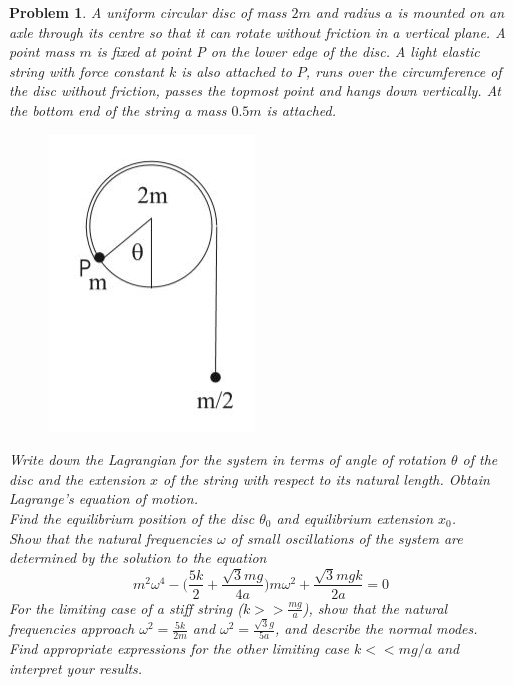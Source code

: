 \documentclass[a4paper]{article}
\theoremstyle{new}
\newtheorem{qns}{Problem}[section]
\begin{document}
\begin{qns}
A uniform circular disc of mass $2m$ and radius $a$ is mounted on an axle through its centre so that it can rotate without friction in a vertical plane. A point mass $m$ is fixed at point P on the lower edge of the disc. A light elastic string with force constant $k$ is also attached to $P$, runs over the circumference of the disc without friction, passes the topmost point and hangs down vertically. At the bottom end of the string a mass $0.5m$ is attached.
\begin{figure}[H]
    \centering
    \includegraphics[scale=0.5]{Q1.JPG}
\end{figure}
Write down the Lagrangian for the system in terms of angle of rotation $\theta$ of the disc and the extension $x$ of the string with respect to its natural length. Obtain Lagrange's equation of motion.\\[5pt]
Find the equilibrium position of the disc $\theta_0$ and equilibrium extension $x_0$.\\[5pt]
Show that the natural frequencies $\omega$ of small oscillations of the system are determined by the solution to the equation
$$m^2\omega^4-\bigg(\frac{5k}{2}+\frac{\sqrt{3}mg}{4a}\bigg)m\omega^2+\frac{\sqrt{3}mgk}{2a}=0$$
For the limiting case of a stiff string ($k>>\frac{mg}{a}$), show that the natural frequencies approach $\omega^2=\frac{5k}{2m}$ and $\omega^2=\frac{\sqrt{3}g}{5a}$, and describe the normal modes.\\[5pt]
Find appropriate expressions for the other limiting case $k<<mg/a$ and interpret your results.
\end{qns}
\end{document}
